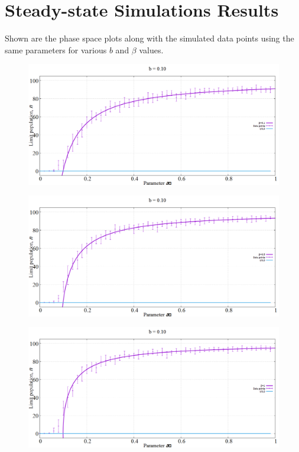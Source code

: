 \chapter{Steady-state Simulations Results}
\label{apndx:ssexpt}
Shown are the phase space plots along with the simulated data points using the same parameters for various $b$ and $\beta$ values.

\begin{figure}[h!]
 \centering
  \includegraphics[width=\linewidth]{images/appendix/simexpt/1.png}
\end{figure}

\begin{figure}[h!]
 \centering
  \includegraphics[width=\linewidth]{images/appendix/simexpt/2.png}
\end{figure}

\begin{figure}[h!]
 \centering
  \includegraphics[width=\linewidth]{images/appendix/simexpt/3.png}
\end{figure}

